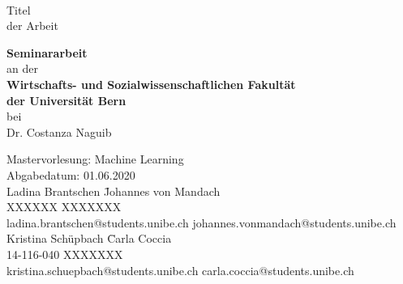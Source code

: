 \documentclass[
  11pt,
]{article}
\author{}
\date{\vspace{-2.5em}}
\begin{document}

\thispagestyle{empty}
\ \vspace{1.0cm}
\begin{center}
{\LARGE
Titel\\[0.1cm]
der Arbeit\\[1cm]
}

{
{\bf Seminararbeit} \\
an der \\[0.5cm]
{\bf Wirtschafts- und Sozialwissenschaftlichen Fakult\"at} \\
{\bf der Universit\"at Bern} \\[0.5cm]
bei \\
Dr. Costanza Naguib\\[8cm]
}


\hspace{1cm}\begin{minipage}[h]{20cm}
\begin{tabbing}
Mastervorlesung: Machine Learning\\
Abgabedatum: 01.06.2020\\[0.5cm]
Ladina Brantschen \hspace{4cm} \= Johannes von Mandach \\
XXXXXX \> XXXXXXX \\
ladina.brantschen@students.unibe.ch \> johannes.vonmandach@students.unibe.ch \\[0.5cm]
Kristina Schüpbach \hspace{4cm} \= Carla Coccia \\
14-116-040 \> XXXXXXX \\
kristina.schuepbach@students.unibe.ch \> carla.coccia@students.unibe.ch \\

\end{tabbing}
\end{minipage}
\end{center}
\newpage




% 
% 
\end{document}
